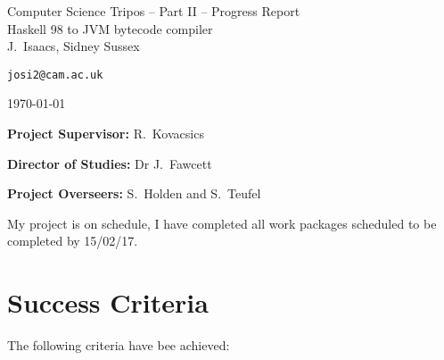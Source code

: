 \documentclass[12pt,a4paper,twoside]{article}
\begin{document}
\begin{center}
  \Large
  Computer Science Tripos -- Part II -- Progress Report\\[4mm]
  \LARGE
  Haskell 98 to JVM bytecode compiler\\[4mm]

  \large
  J.~Isaacs, Sidney Sussex

  \texttt{josi2@cam.ac.uk}

  \today
\end{center}

\vspace{5mm}

\textbf{Project Supervisor:} R.~Kovacsics

\textbf{Director of Studies:} Dr J.~Fawcett 

\textbf{Project Overseers:} S.~Holden and S.~Teufel


My project is on schedule, I have completed all work packages scheduled to be completed by 15/02/17.




 \section*{Success Criteria}

  The following criteria have bee achieved:
\end{document}

